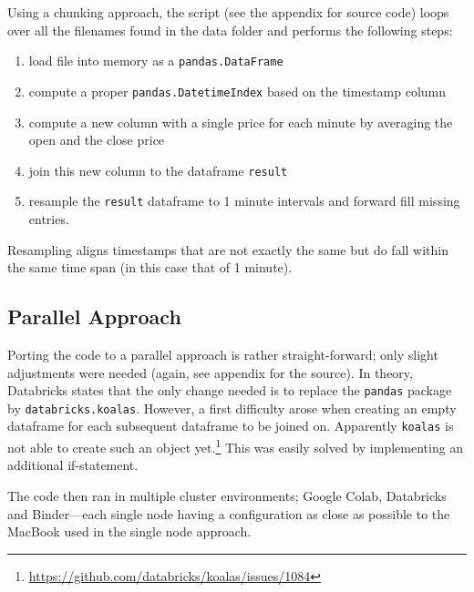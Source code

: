 Using a chunking approach, the script (see the appendix for source code) loops over all the filenames found in the data folder and performs the following steps:
\begin{enumerate}
    \item load file into memory as a \texttt{pandas.DataFrame}
    \item compute a proper \texttt{pandas.DatetimeIndex} based on the timestamp column
    \item compute a new column with a single price for each minute by averaging the open and the close price
    \item join this new column to the dataframe \texttt{result}
    \item resample the \texttt{result} dataframe to 1 minute intervals and forward fill missing entries.
\end{enumerate}

Resampling aligns timestamps that are not exactly the same but do fall within the same time span (in this case that of 1 minute).

\subsection{Parallel Approach}

Porting the code to a parallel approach is rather straight-forward; only slight adjustments were needed (again, see appendix for the source). In theory, Databricks states that the only change needed is to replace the \texttt{pandas} package by \texttt{databricks.koalas}. However, a first difficulty arose when creating an empty dataframe for each subsequent dataframe to be joined on. Apparently \texttt{koalas} is not able to create such an object yet.\footnote{\url{https://github.com/databricks/koalas/issues/1084}} This was easily solved by implementing an additional if-statement.

The code then ran in multiple cluster environments; Google Colab\cite{carneiro2018performance}, Databricks and Binder\cite{jupyter2018binder}---each single node having a configuration as close as possible to the MacBook used in the single node approach.
